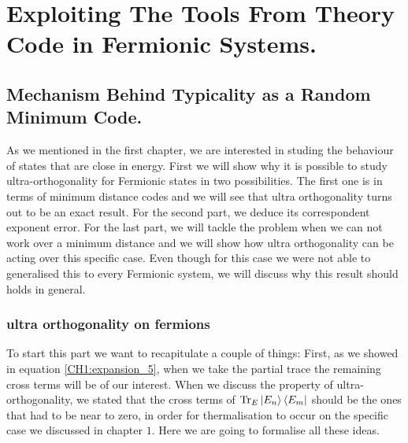 \chapter{Exploiting The Tools From Theory Code in Fermionic Systems.}
\section{Mechanism Behind Typicality as a Random Minimum Code.}
As we mentioned in the first chapter, we are interested in studing the behaviour of states that are close in energy. First we will show why it is possible to study ultra-orthogonality for Fermionic states in two possibilities. The first one is in terms of minimum distance codes and we will see that ultra orthogonality turns out to be an exact result. For the second part, we deduce its correspondent exponent error. For the last part, we will tackle the problem when we can not work over a minimum distance and we will show how ultra orthogonality can be acting over this specific case. Even though for this case we were not able to generalised this to every Fermionic system, we will discuss why this result should holds in general.

\subsection{ultra orthogonality on fermions}
To start this part we want to recapitulate a couple of things: First, as we showed in equation \eqref{CH1:expansion_5}, when we take the partial trace the remaining cross terms  will be of our interest. When we discuss the property of ultra-orthogonality, we stated that the cross terms of $\operatorname{Tr}_{E}\mathinner{|{E_n}\rangle}\mathinner{\langle{E_m}|}$ should be the ones that had to be near to zero, in order for thermalisation to occur on the specific case we discussed in chapter $1$. Here we are going to formalise all these ideas.\\

